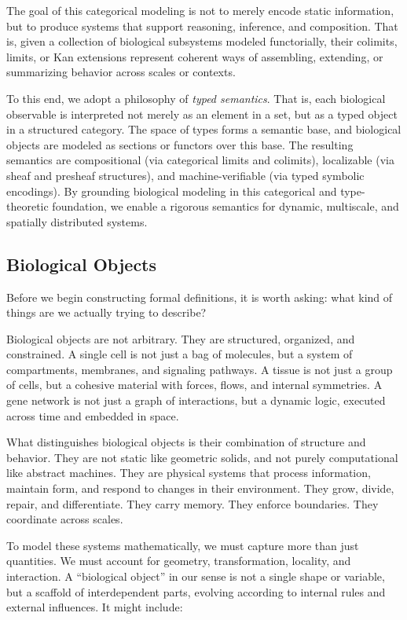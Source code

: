 The goal of this categorical modeling is not to merely encode static information, but to produce systems that support reasoning, inference, and composition. That is, given a collection of biological subsystems modeled functorially, their colimits, limits, or Kan extensions represent coherent ways of assembling, extending, or summarizing behavior across scales or contexts.

To this end, we adopt a philosophy of \emph{typed semantics}. That is, each biological observable is interpreted not merely as an element in a set, but as a typed object in a structured category. The space of types forms a semantic base, and biological objects are modeled as sections or functors over this base. The resulting semantics are compositional (via categorical limits and colimits), localizable (via sheaf and presheaf structures), and machine-verifiable (via typed symbolic encodings). By grounding biological modeling in this categorical and type-theoretic foundation, we enable a rigorous semantics for dynamic, multiscale, and spatially distributed systems. 


\subsection{Biological Objects}

Before we begin constructing formal definitions, it is worth asking: what kind of things are we actually trying to describe?

Biological objects are not arbitrary. They are structured, organized, and constrained. A single cell is not just a bag of molecules, but a system of compartments, membranes, and signaling pathways. A tissue is not just a group of cells, but a cohesive material with forces, flows, and internal symmetries. A gene network is not just a graph of interactions, but a dynamic logic, executed across time and embedded in space.

What distinguishes biological objects is their combination of structure and behavior. They are not static like geometric solids, and not purely computational like abstract machines. They are physical systems that process information, maintain form, and respond to changes in their environment. They grow, divide, repair, and differentiate. They carry memory. They enforce boundaries. They coordinate across scales.

To model these systems mathematically, we must capture more than just quantities. We must account for geometry, transformation, locality, and interaction. A “biological object” in our sense is not a single shape or variable, but a scaffold of interdependent parts, evolving according to internal rules and external influences. It might include:

